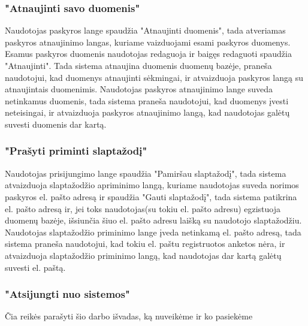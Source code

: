 \documentclass{VUMIFPSbakalaurinis}
\begin{document}
\subsubsection{"Atnaujinti savo duomenis"}
Naudotojas paskyros lange spaudžia "Atnaujinti duomenis", tada atveriamas paskyros atnaujinimo langas, kuriame vaizduojami esami paskyros duomenys. Esamus paskyros duomenis naudotojas redaguoja ir baigęs redaguoti spaudžia "Atnaujinti". Tada sistema atnaujina duomenis duomenų bazėje, praneša naudotojui, kad duomenys atnaujinti sėkmingai, ir atvaizduoja paskyros langą su atnaujintais duomenimis.
Naudotojas paskyros atnaujinimo lange suveda netinkamus duomenis, tada sistema praneša naudotojui, kad duomenys įvesti neteisingai, ir atvaizduoja paskyros atnaujinimo langą, kad naudotojas galėtų suvesti duomenis dar kartą.
\subsubsection{"Prašyti priminti slaptažodį"}
Naudotojas prisijungimo lange spaudžia "Pamiršau slaptažodį", tada sistema atvaizduoja slaptažodžio apriminimo langą, kuriame naudotojas suveda norimos paskyros el. pašto adresą ir spaudžia "Gauti slaptažodį", tada sistema patikrina el. pašto adresą ir, jei toks naudotojas(su tokiu el. pašto adresu) egzistuoja duomenų bazėje, išsiunčia šiuo el. pašto adresu laišką su naudotojo slaptažodžiu.
Naudotojas slaptažodžio priminimo lange įveda netinkamą el. pašto adresą, tada sistema praneša naudotojui, kad tokiu el. paštu registruotos anketos nėra, ir atvaizduoja slaptažodžio priminimo langą, kad naudotojas dar kartą galėtų suvesti el. paštą.
\subsubsection{"Atsijungti nuo sistemos"}


Čia reikės parašyti šio darbo išvadas, ką nuveikėme ir ko pasiekėme

\printbibliography[heading=bibintoc]  %
\end{document}
